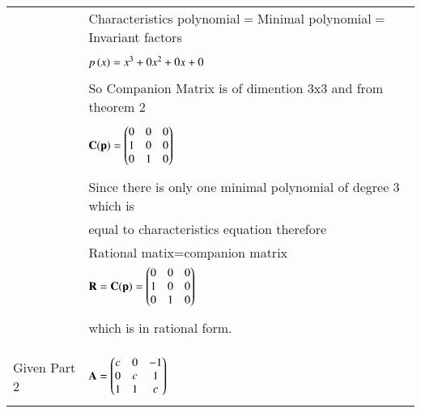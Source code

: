 \begin{longtable}{|l|l|}
&Characteristics polynomial$=$Minimal polynomial$=$Invariant factors\\
&\\
&$p\left(x\right)=x^3+0x^2+0x+0$\\
&\\
&So Companion Matrix is of dimention 3x3 and from theorem 2\\
&\\
&$\mathbf{C(p)}=\begin{pmatrix}0&0&0\\1&0&0\\0&1&0\end{pmatrix}$\\
&\\
&Since there is only one minimal polynomial of degree 3 
which is\\ &equal to characteristics equation therefore\\ &Rational matix=companion matrix\\ 
&$\mathbf{R}=\mathbf{C(p)}=\begin{pmatrix}0&0&0\\1&0&0\\0&1&0\end{pmatrix}$\\
&\\
&which is in rational form.\\
&\\
\hline \hline
&\\




\multirow{3}{*}{Given Part 2} & \\
&$\mathbf{A}=\begin{pmatrix}c&0&-1\\0&c&1\\1&1&c\end{pmatrix}$\\
&\\
\hline



\end{longtable}

